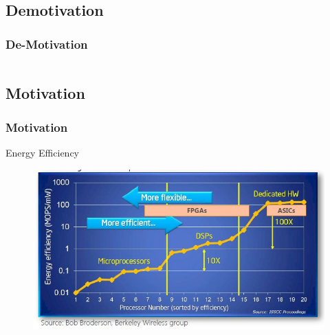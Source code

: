\documentclass{beamer}
\begin{document}
\begin{frame}
\subsection{Demotivation}
\frametitle{De-Motivation}
\begin{columns}[c]

\scalebox{0.7}{

}
\scalebox{0.3}{

}


\end{columns}
\end{frame}
\begin{frame}
\subsection{Motivation}
\frametitle{Motivation}


\begin{block} {Energy Efficiency}
\begin{figure}
\includegraphics[width=\linewidth,center]{fpgaefficiency.jpg}
\end{figure}
\end{block}

\end{frame}
\end{document}
